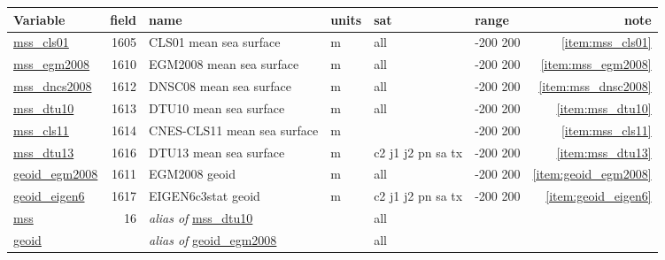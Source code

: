 \documentclass[a4paper,11pt,openany,natbib]{thesis}
\makeatletter
\newcommand\var[1]{\url{#1}\index{variables!#1@\protect\url{#1}}}
\newcommand\alias[1]{\emph{alias of} \var{#1}}
\newenvironment{vartable}{
\begin{table}[ht]
\small
\begin{tabular}{lrllllr}
\hline
Variable & field & name & units & sat & range & note \\
\hline
}{
\hline
\end{tabular}
\end{table}
}
\makeatother
\begin{document}
\begin{vartable}
\var{mss_cls01} & 1605 & CLS01 mean sea surface & m & all & -200 200 & \ref{item:mss_cls01} \\
\var{mss_egm2008} & 1610 & EGM2008 mean sea surface & m & all & -200 200 & \ref{item:mss_egm2008} \\
\var{mss_dncs2008} & 1612 & DNSC08 mean sea surface & m & all & -200 200 & \ref{item:mss_dnsc2008} \\
\var{mss_dtu10} & 1613 & DTU10 mean sea surface & m & all & -200 200 & \ref{item:mss_dtu10} \\
\var{mss_cls11} & 1614 & {CNES-CLS11} mean sea surface & m &  & -200 200 & \ref{item:mss_cls11} \\
\var{mss_dtu13} & 1616 & DTU13 mean sea surface & m & c2 j1 j2 pn sa tx & -200 200 & \ref{item:mss_dtu13} \\
\var{geoid_egm2008} & 1611 & EGM2008 geoid & m & all & -200 200 & \ref{item:geoid_egm2008} \\
\var{geoid_eigen6} & 1617 & EIGEN6c3stat geoid & m & c2 j1 j2 pn sa tx & -200 200 & \ref{item:geoid_eigen6} \\
\hline
\var{mss} & 16 & \alias{mss_dtu10} && all && \\
\var{geoid} && \alias{geoid_egm2008} && all && \\
\end{vartable}
\end{document}
